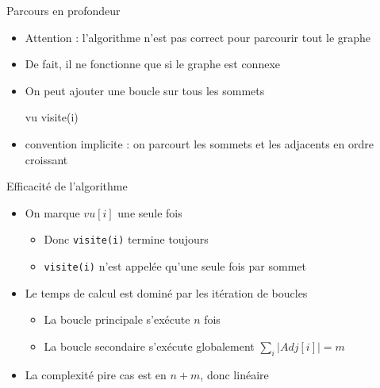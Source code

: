 
\begin{frame}{Parcours en profondeur}
    \begin{itemize}
        \item Attention : l'algorithme n'est pas correct pour parcourir tout le graphe
        \item De fait, il ne fonctionne que si le graphe est connexe 
        \pause 
        \item On peut ajouter une boucle sur tous les sommets 
        \pause 
        \begin{algorithm}[H]
            \begin{algorithmic}[1]
                \State vu 
                        \State visite(i)
                    \EndIf
                \EndFor
             \end{algorithmic}
            \caption{Parcours en profondeur}
            \label{alg:prof:alg}
            \end{algorithm}
        \pause 
        \item convention implicite : on parcourt les sommets et les adjacents en ordre croissant
    \end{itemize}
\end{frame}

\begin{frame}{Efficacité de l'algorithme}
    \begin{itemize}
        \item On marque $vu[i]$ une seule fois 
        \begin{itemize}
            \item Donc \texttt{visite(i)} termine toujours
            \item \texttt{visite(i)} n'est appelée qu'une seule fois par sommet
        \end{itemize}
        \item Le temps de calcul est dominé par les itération de boucles
        \begin{itemize}
            \item La boucle principale s'exécute $n$ fois 
            \item La boucle secondaire s'exécute globalement $\sum_i | Adj[i] | = m$
        \end{itemize}
        \item La complexité pire cas est en $n+m$, donc linéaire
    \end{itemize}
\end{frame}


